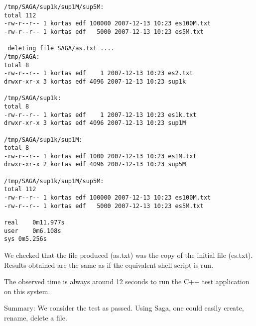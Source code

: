 \begin{small}
\begin{lstlisting}
/tmp/SAGA/sup1k/sup1M/sup5M:
total 112
-rw-r--r-- 1 kortas edf 100000 2007-12-13 10:23 es100M.txt
-rw-r--r-- 1 kortas edf   5000 2007-12-13 10:23 es5M.txt

 deleting file SAGA/as.txt ....
/tmp/SAGA:
total 8
-rw-r--r-- 1 kortas edf    1 2007-12-13 10:23 es2.txt
drwxr-xr-x 3 kortas edf 4096 2007-12-13 10:23 sup1k

/tmp/SAGA/sup1k:
total 8
-rw-r--r-- 1 kortas edf    1 2007-12-13 10:23 es1k.txt
drwxr-xr-x 3 kortas edf 4096 2007-12-13 10:23 sup1M

/tmp/SAGA/sup1k/sup1M:
total 8
-rw-r--r-- 1 kortas edf 1000 2007-12-13 10:23 es1M.txt
drwxr-xr-x 2 kortas edf 4096 2007-12-13 10:23 sup5M

/tmp/SAGA/sup1k/sup1M/sup5M:
total 112
-rw-r--r-- 1 kortas edf 100000 2007-12-13 10:23 es100M.txt
-rw-r--r-- 1 kortas edf   5000 2007-12-13 10:23 es5M.txt

real	0m11.977s
user	0m6.108s
sys	0m5.256s
\end{lstlisting}
 \end{small}



We checked that the file produced (as.txt) was the copy of the 
initial file (es.txt). Results obtained are the same as if
the equivalent shell script  is run.


The observed time is always around 12 seconds to run the C++ test
application on this system.

Summary: We consider the test as passed.
Using Saga, one could easily create, rename, delete a file.









